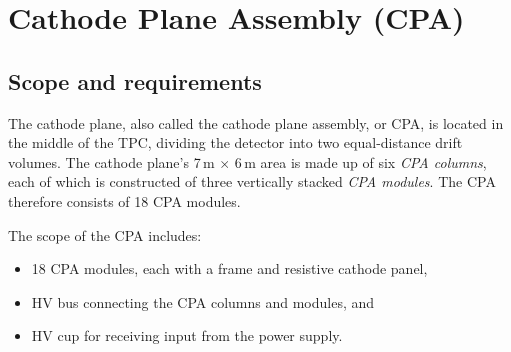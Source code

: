 


\section{Cathode Plane Assembly (CPA)}
\label{sec:cpa}

\subsection{Scope and requirements}

The cathode plane, also called the cathode plane assembly, or CPA, is located in the middle of the TPC, dividing the detector into two equal-distance drift volumes. The cathode plane's 7\,m $\times$ 6\,m area is made up of six \textit{CPA columns}, each of which is constructed of three vertically stacked \textit{CPA modules}. The CPA therefore consists of 18 CPA modules. 

The scope of the CPA includes:

\begin{itemize}
\item 18 CPA modules, each with a frame and resistive cathode panel, %
\item HV bus connecting the CPA columns and modules, and
\item HV cup for receiving input from the power supply.
\end{itemize}


